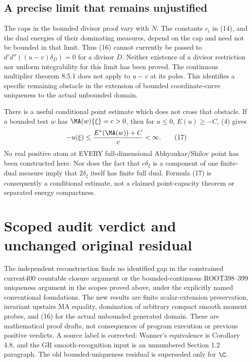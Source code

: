 \subsection{A precise limit that remains unjustified}
The caps in the bounded divisor proof vary with $N$. The constants $c_i$ in
(14), and the dual energies of their dominating measures, depend on the cap
and need not be bounded in that limit. Thus (16) cannot currently be passed
to $d'd''((u-v)\delta_D)=0$ for a divisor $D$. Neither existence of a divisor
restriction nor uniform integrability for this limit has been proved.
The continuous multiplier theorem 8.5.1 does not apply to $u-v$ at its poles.
This identifies a specific remaining obstacle in the extension of bounded
coordinate-curve uniqueness to the actual unbounded domain.

There is a useful conditional point estimate which does not cross that obstacle.
If a bounded test $w$ has $\MA(w)\{\xi\}=c>0$, then for $u\le0$,
$E(u)\ge-C$, (4) gives
\[
 -u(\xi)\le\frac{E^*(\MA(w))+C}{c}<\infty.                \tag{17}
\]
No real positive atom at EVERY full-dimensional Abhyankar/Shilov point has
been constructed here. Nor does the fact that $c\delta_\xi$ is a component
of one finite-dual measure imply that $2\delta_\xi$ itself has finite full
dual. Formula (17) is consequently a conditional estimate, not a claimed
point-capacity theorem or separated energy compactness.
\section{Scoped audit verdict and unchanged original residual}
The independent reconstruction finds no identified gap in the constrained
current400 countable closure argument or the bounded-continuous
ROOT398--399 uniqueness argument
in the scopes proved above, under the explicitly named conventional foundations.
The new results are finite scalar-extension preservation, invariant upstairs
MA equality, domination of arbitrary compact smooth moment probes, and (16)
for the actual unbounded generated domain. These are mathematical proof drafts,
not consequences of program execution or previous positive verdicts.
A source label is corrected: Wanner's equivalence is Corollary 4.8, and the
GR smooth-recognition input is an unnumbered Section 1.2 paragraph.
The old bounded-uniqueness residual is superseded only for $\C$.

